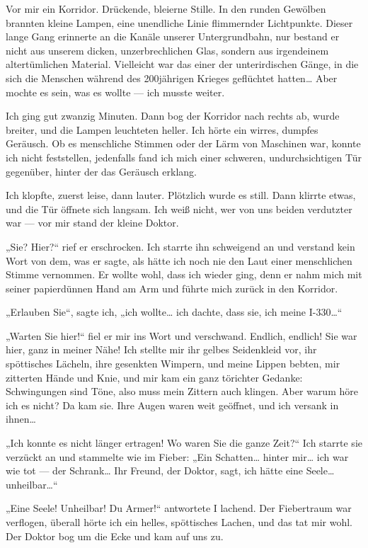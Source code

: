 Vor mir ein Korridor. Drückende, bleierne Stille. In den runden
Gewölben brannten kleine Lampen, eine unendliche Linie flimmernder
Lichtpunkte. Dieser lange Gang erinnerte an die Kanäle unserer
Untergrundbahn, nur bestand er nicht aus unserem dicken,
unzerbrechlichen Glas, sondern aus irgendeinem altertümlichen
Material. Vielleicht war das einer der unterirdischen Gänge, in die
sich die Menschen während des 200jährigen Krieges geflüchtet
hatten\ldots{} Aber mochte es sein, was es wollte — ich musste weiter.

Ich ging gut zwanzig Minuten. Dann bog der Korridor nach rechts ab,
wurde breiter, und die Lampen leuchteten heller. Ich hörte ein
wirres, dumpfes Geräusch. Ob es menschliche Stimmen oder der Lärm
von Maschinen war, konnte ich nicht feststellen, jedenfalls fand
ich mich einer schweren, undurchsichtigen Tür gegenüber, hinter der
das Geräusch erklang.

Ich klopfte, zuerst leise, dann lauter. Plötzlich wurde es still.
Dann klirrte etwas, und die Tür öffnete sich langsam. Ich weiß
nicht, wer von uns beiden verdutzter war — vor mir stand der kleine
Doktor.

„Sie? Hier?“ rief er erschrocken. Ich starrte ihn schweigend an und
verstand kein Wort von dem, was er sagte, als hätte ich noch nie
den Laut einer menschlichen Stimme vernommen. Er wollte wohl, dass
ich wieder ging, denn er nahm mich mit seiner papierdünnen Hand am
Arm und führte mich zurück in den Korridor.

„Erlauben Sie“, sagte
ich, „ich wollte\ldots{} ich dachte, dass sie, ich meine I-330\ldots{}“

„Warten Sie hier!“ fiel er mir ins Wort und verschwand. Endlich,
endlich! Sie war hier, ganz in meiner Nähe! Ich stellte mir ihr
gelbes Seidenkleid vor, ihr spöttisches Lächeln, ihre gesenkten
Wimpern, und meine Lippen bebten, mir zitterten Hände und Knie, und
mir kam ein ganz törichter Gedanke: Schwingungen sind Töne, also
muss mein Zittern auch klingen. Aber warum höre ich es nicht? Da
kam sie. Ihre Augen waren weit geöffnet, und ich versank in
ihnen\ldots{}

„Ich konnte es nicht länger ertragen! Wo waren Sie die ganze Zeit?“
Ich starrte sie verzückt an und stammelte wie im Fieber: „Ein
Schatten\ldots{} hinter mir\ldots{} ich war wie tot — der Schrank\ldots{} Ihr
Freund, der Doktor, sagt, ich hätte eine Seele\ldots{} unheilbar\ldots{}“

„Eine Seele! Unheilbar! Du Armer!“ antwortete I lachend. Der
Fiebertraum war verflogen, überall hörte ich ein helles,
spöttisches Lachen, und das tat mir wohl. Der Doktor bog um die
Ecke und kam auf uns zu.

